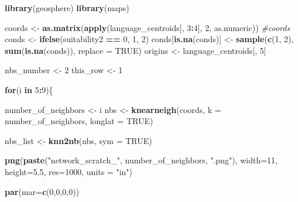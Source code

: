 \documentclass[]{book}
\newenvironment{Shaded}{\begin{snugshade}}{\end{snugshade}}
\newcommand{\KeywordTok}[1]{\textcolor[rgb]{0.13,0.29,0.53}{\textbf{{#1}}}}
\newcommand{\DataTypeTok}[1]{\textcolor[rgb]{0.13,0.29,0.53}{{#1}}}
\newcommand{\DecValTok}[1]{\textcolor[rgb]{0.00,0.00,0.81}{{#1}}}
\newcommand{\FloatTok}[1]{\textcolor[rgb]{0.00,0.00,0.81}{{#1}}}
\newcommand{\StringTok}[1]{\textcolor[rgb]{0.31,0.60,0.02}{{#1}}}
\newcommand{\CommentTok}[1]{\textcolor[rgb]{0.56,0.35,0.01}{\textit{{#1}}}}
\newcommand{\OtherTok}[1]{\textcolor[rgb]{0.56,0.35,0.01}{{#1}}}
\newcommand{\ControlFlowTok}[1]{\textcolor[rgb]{0.13,0.29,0.53}{\textbf{{#1}}}}
\newcommand{\OperatorTok}[1]{\textcolor[rgb]{0.81,0.36,0.00}{\textbf{{#1}}}}
\newcommand{\NormalTok}[1]{{#1}}
\theoremstyle{definition}
\theoremstyle{definition}
\theoremstyle{remark}
\begin{document}
\begin{Shaded}
\begin{Highlighting}[]
\KeywordTok{library}\NormalTok{(geosphere)}
\KeywordTok{library}\NormalTok{(maps)}
\end{Highlighting}
\end{Shaded}

\begin{Shaded}
\begin{Highlighting}[]
\NormalTok{coords <-}\StringTok{ }\KeywordTok{as.matrix}\NormalTok{(}\KeywordTok{apply}\NormalTok{(language_centroids[, }\DecValTok{3}\OperatorTok{:}\DecValTok{4}\NormalTok{], }\DecValTok{2}\NormalTok{, as.numeric)) }\CommentTok{#coords}
\NormalTok{conds <-}\StringTok{ }\KeywordTok{ifelse}\NormalTok{(suitability2 }\OperatorTok{==}\StringTok{ }\DecValTok{0}\NormalTok{, }\DecValTok{1}\NormalTok{, }\DecValTok{2}\NormalTok{)}
\NormalTok{conds[}\KeywordTok{is.na}\NormalTok{(conds)] <-}\StringTok{ }\KeywordTok{sample}\NormalTok{(}\KeywordTok{c}\NormalTok{(}\DecValTok{1}\NormalTok{, }\DecValTok{2}\NormalTok{), }\KeywordTok{sum}\NormalTok{(}\KeywordTok{is.na}\NormalTok{(conds)), }\DataTypeTok{replace =} \OtherTok{TRUE}\NormalTok{) }
\NormalTok{origins <-}\StringTok{ }\NormalTok{language_centroids[, }\DecValTok{5}\NormalTok{]}



\NormalTok{nbs_number <-}\StringTok{ }\DecValTok{2}
\NormalTok{this_row <-}\StringTok{ }\DecValTok{1}

\ControlFlowTok{for}\NormalTok{(i }\ControlFlowTok{in} \DecValTok{5}\OperatorTok{:}\DecValTok{9}\NormalTok{)\{}

\NormalTok{number_of_neighbors <-}\StringTok{ }\NormalTok{i}
\NormalTok{nbs <-}\StringTok{ }\KeywordTok{knearneigh}\NormalTok{(coords, }\DataTypeTok{k =}\NormalTok{ number_of_neighbors, }\DataTypeTok{longlat =} \OtherTok{TRUE}\NormalTok{) }

\NormalTok{nbs_list <-}\StringTok{ }\KeywordTok{knn2nb}\NormalTok{(nbs, }\DataTypeTok{sym =} \OtherTok{TRUE}\NormalTok{)}


\KeywordTok{png}\NormalTok{(}\KeywordTok{paste}\NormalTok{(}\StringTok{"network_scratch_"}\NormalTok{, number_of_neighbors, }\StringTok{".png"}\NormalTok{), }\DataTypeTok{width=}\DecValTok{11}\NormalTok{, }\DataTypeTok{height=}\FloatTok{5.5}\NormalTok{, }\DataTypeTok{res=}\DecValTok{1000}\NormalTok{, }\DataTypeTok{units =} \StringTok{"in"}\NormalTok{)}


\KeywordTok{par}\NormalTok{(}\DataTypeTok{mar=}\KeywordTok{c}\NormalTok{(}\DecValTok{0}\NormalTok{,}\DecValTok{0}\NormalTok{,}\DecValTok{0}\NormalTok{,}\DecValTok{0}\NormalTok{))}


\end{Highlighting}
\end{Shaded}
\end{document}
